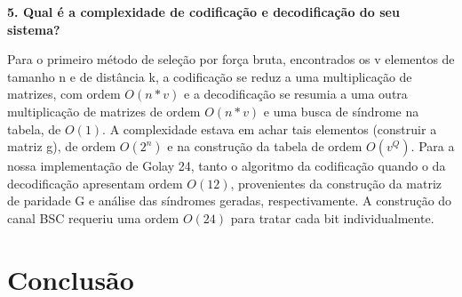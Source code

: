 \documentclass[%
aip,
jmp,%
amsmath,amssymb,
reprint,%
]{revtex4-1}
\begin{document}
	\textbf{5. Qual é a complexidade de codificação e decodificação do seu sistema?}\newline
		
	Para o primeiro método de seleção por força bruta, encontrados os v elementos de tamanho n e de distância k, a codificação se reduz a uma multiplicação de matrizes, com ordem $O(n*v)$ e a decodificação se resumia a uma outra multiplicação de matrizes de ordem $O(n*v)$ e uma busca de síndrome na tabela, de $O(1)$. A complexidade estava em achar tais elementos (construir a matriz g), de ordem $O(2^n)$ e na construção da tabela de ordem $O(v^Q)$.
	Para a nossa implementação de Golay 24, tanto o algoritmo da codificação quando o da decodificação apresentam ordem $O(12)$, provenientes da construção da matriz de paridade G e análise das síndromes geradas, respectivamente. A construção do canal BSC requeriu uma ordem $O(24)$ para tratar cada bit individualmente.
	
	
	\section{Conclus\~ao}
	
	
	
	
\flushleft
\flushleft

\pagebreak
\newpage
\newpage

\cleardoublepage
{}
{}


\end{document}
